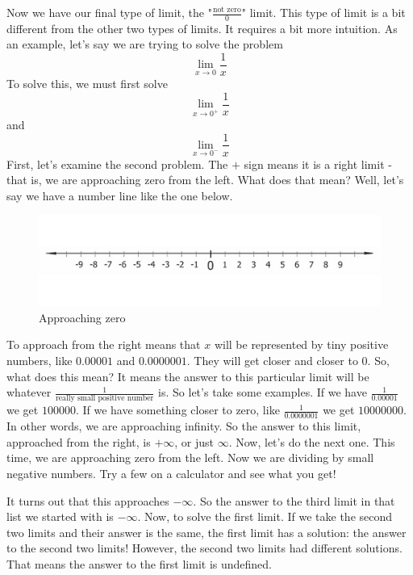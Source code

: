 \documentclass{memoir}
\begin{document}
Now we have our final type of limit, the "$\frac{\text{not zero}}{0}$" limit. 
This type of limit is a bit different from the other two types of limits. 
It requires a bit more intuition. As an example, let's say we are trying to solve the problem
\begin{equation*}
    \lim\limits_{x\rightarrow 0}\frac{1}{x}
\end{equation*}
To solve this, we must first solve
\begin{equation*}
    \lim\limits_{x\rightarrow 0^+}\frac{1}{x}
\end{equation*}
and
\begin{equation*}
    \lim\limits_{x\rightarrow 0^-}\frac{1}{x}
\end{equation*}
First, let's examine the second problem. 
The $+$ sign means it is a right limit - that is, we are approaching zero from the left. 
What does that mean? Well, let's say we have a number line like the one below.

\begin{figure}[H]
\caption{Approaching zero}
\includegraphics[scale=0.75]{../numberline.jpg}
\end{figure}

To approach from the right means that $x$ will be represented by tiny positive numbers, like $0.00001$ and $0.0000001$. 
They will get closer and closer to $0$. 
So, what does this mean? 
It means the answer to this particular limit will be whatever $\frac{1}{\text{really small positive number}}$ is. 
So let's take some examples. 
If we have $\frac{1}{0.00001}$ we get $100000$. 
If we have something closer to zero, like $\frac{1}{0.0000001}$ we get $10000000$. 
In other words, we are approaching infinity.
So the answer to this limit, approached from the right, is $+\infty$, or just $\infty$. 
Now, let's do the next one. 
This time, we are approaching zero from the left. Now we are dividing by small negative numbers. Try a few on a calculator and see what you get!

It turns out that this approaches $-\infty$. 
So the answer to the third limit in that list we started with is $-\infty$. 
Now, to solve the first limit. 
If we take the second two limits and their answer is the same, the first limit has a solution: the answer to the second two limits! 
However, the second two limits had different solutions. That means the answer to the first limit is undefined.
\end{document}
